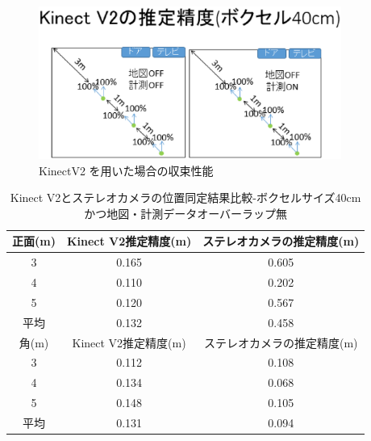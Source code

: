 %
\begin{figure}[htbp]
  \begin{center}
   \includegraphics[height=50mm]{figure/KinectV2性能.eps}
   \caption{KinectV2 を用いた場合の収束性能}
   \label{KinectV2性能}
  \end{center}
\end{figure}
%

\begin{table}[htbp]
\begin{center}
\begin{tabular}{|c|c|c|} \hline
正面(m) & Kinect V2推定精度(m) & ステレオカメラの推定精度(m)\\ \hline
3 & 0.165 & 0.605 \\ \hline
4 & 0.110 & 0.202 \\ \hline
5 & 0.120 & 0.567 \\ \hline
平均 & 0.132 & 0.458 \\ \hline\hline
角(m) & Kinect V2推定精度(m) & ステレオカメラの推定精度(m)\\ \hline
3 & 0.112 & 0.108 \\ \hline
4 & 0.134 & 0.068 \\ \hline
5 & 0.148 & 0.105 \\ \hline
平均 & 0.131 & 0.094 \\ \hline
\end{tabular}
\caption{Kinect V2とステレオカメラの位置同定結果比較-ボクセルサイズ40cmかつ地図・計測データオーバーラップ無}
\end{center}
\end{table}

